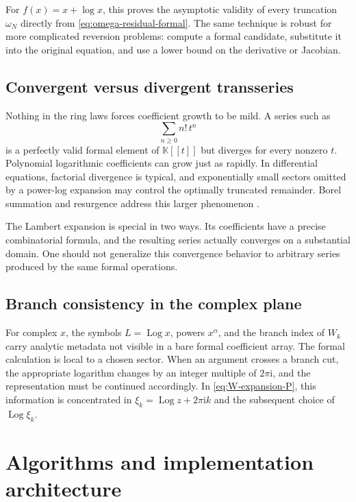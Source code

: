 \documentclass[11pt]{article}
\theoremstyle{pltheorem}
\newcommand{\K}{\mathbb K}
\newcommand{\ii}{\mathrm i}
\newcommand{\Log}{\operatorname{Log}}
\begin{document}
For \(f(x)=x+\log x\), this proves the asymptotic validity of every truncation \(\omega_N\) directly from
\cref{eq:omega-residual-formal}.  The same technique is robust for more complicated reversion problems: compute a formal candidate, substitute it into the original equation, and use a lower bound on the derivative or Jacobian.

\subsection{Convergent versus divergent transseries}

Nothing in the ring laws forces coefficient growth to be mild.  A series such as
\[
 \sum_{n\ge0}n!\,t^n
\]
is a perfectly valid formal element of \(\K[[t]]\) but diverges for every nonzero \(t\).  Polynomial logarithmic coefficients can grow just as rapidly.  In differential equations, factorial divergence is typical, and exponentially small sectors omitted by a power-log expansion may control the optimally truncated remainder.  Borel summation and resurgence address this larger phenomenon \cite{costin-book,ecalle}.

The Lambert expansion is special in two ways.  Its coefficients have a precise combinatorial formula, and the resulting series actually converges on a substantial domain.  One should not generalize this convergence behavior to arbitrary series produced by the same formal operations.

\subsection{Branch consistency in the complex plane}

For complex \(x\), the symbols \(L=\Log x\), powers \(x^\alpha\), and the branch index of \(W_k\) carry analytic metadata not visible in a bare formal coefficient array.  The formal calculation is local to a chosen sector.  When an argument crosses a branch cut, the appropriate logarithm changes by an integer multiple of \(2\pi\ii\), and the representation must be continued accordingly.  In \cref{eq:W-expansion-P}, this information is concentrated in
\(\xi_k=\Log z+2\pi\ii k\) and the subsequent choice of \(\Log\xi_k\).

\section{Algorithms and implementation architecture}
\label{sec:implementation}
\end{document}
